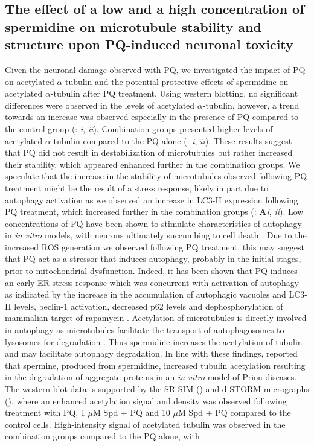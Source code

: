 \subsection{ The effect of a low and a high concentration of spermidine on microtubule stability and structure upon PQ-induced neuronal toxicity}
Given the neuronal damage observed with PQ, we investigated the impact of PQ on acetylated $\alpha$-tubulin and the potential protective effects of spermidine on acetylated $\alpha$-tubulin after PQ treatment. Using western blotting, no significant differences were observed in the levels of acetylated $\alpha$-tubulin, however, a trend towards an increase was observed especially in the presence of PQ compared to the control group (: \textit{i}, \textit{ii}). Combination groups presented higher levels of acetylated $\alpha$-tubulin compared to the PQ alone (: \textit{i}, \textit{ii}). These results suggest that PQ did not result in destabilization of microtubules but rather increased their stability, which appeared enhanced further in the combination groups. We speculate that the increase in the stability of microtubules observed following PQ treatment might be the result of a stress response, likely in part due to autophagy activation as we observed an increase in LC3-II expression following PQ treatment, which increased further in the combination groups (: \textbf{A}\textit{i}, \textit{ii}). Low concentrations of PQ have been shown to stimulate characteristics of autophagy in \textit{in vitro} models, with neurons ultimately succumbing to cell death \citep{Gonzalez-Polo2009,Gonzalez-Polo2007a,Gonzalez-Polo2007b,Niso-Santano2006}. Due to the increased ROS generation we observed following PQ treatment, this may suggest that PQ act as a stressor that induces autophagy, probably in the initial stages, prior to mitochondrial dysfunction. Indeed, it has been shown that PQ induces an early ER stress response which was concurrent with activation of autophagy as indicated by the increase in the accumulation of autophagic vacuoles and LC3-II levels, beclin-1 activation, decreased p62 levels and dephosphorylation of  mammalian target of rapamycin \citep{Gonzalez-Polo2007a,Gonzalez-Polo2007b,Niso-Santano2011}. Acetylation of microtubules is directly involved in autophagy as microtubules facilitate the transport of autophagosomes to lysosomes for degradation \citep{Phadwal2018,Xie2010}. Thus spermidine increases the acetylation of tubulin and may facilitate autophagy degradation. In line with these findings, \citet{Phadwal2018} reported that spermine, produced from spermidine, increased tubulin acetylation resulting in the degradation of aggregate proteins in an \textit{in vitro} model of Prion diseases. The western blot data is supported by the SR-SIM () and d-STORM micrographs (), where an enhanced acetylation signal and density was observed following treatment with PQ, 1 $\mu$M Spd + PQ and 10 $\mu$M Spd + PQ compared to the control cells. High-intensity signal of acetylated tubulin was observed in the combination groups compared to the PQ alone, with 